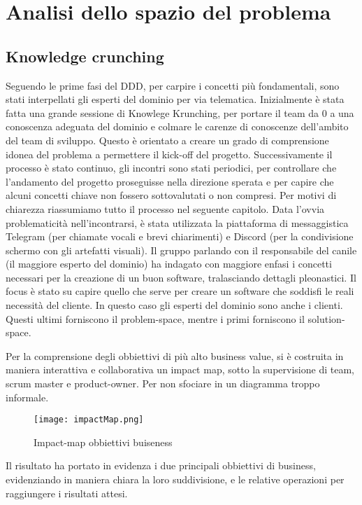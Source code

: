 \chapter{Analisi dello spazio del problema}

	\section{Knowledge crunching}
	Seguendo le prime fasi del DDD, per carpire i concetti più fondamentali, sono stati interpellati gli esperti del dominio per via telematica. 
	Inizialmente è stata fatta una grande sessione di Knowlege Krunching, per portare il team da 0 a una conoscenza adeguata del dominio e colmare le carenze di conoscenze dell'ambito del team di sviluppo. Questo è orientato a creare un grado di comprensione idonea del problema a permettere il kick-off del progetto.  
	Successivamente il processo è stato continuo, gli incontri sono stati periodici, per controllare che l'andamento del progetto proseguisse nella direzione sperata e per capire che alcuni concetti chiave non fossero sottovalutati o non compresi. 
	Per motivi di chiarezza riassumiamo tutto il processo nel seguente capitolo.
	Data l'ovvia problematicità nell'incontrarsi, è stata utilizzata la piattaforma di messaggistica Telegram (per chiamate vocali e brevi chiarimenti) e Discord (per la condivisione schermo con gli artefatti visuali). 
	Il gruppo parlando con il responsabile del canile (il maggiore esperto del dominio) ha indagato con maggiore enfasi i concetti necessari per la creazione di un buon software, tralasciando dettagli pleonastici. Il focus è stato su capire quello che serve per creare un software che soddisfi le reali necessità del cliente. 
	In questo caso gli esperti del dominio sono anche i clienti. Questi ultimi forniscono il problem-space, mentre i primi forniscono il solution-space.
	
	Per la comprensione degli obbiettivi di più alto business value, si è costruita in maniera interattiva e collaborativa un impact map, sotto la supervisione di team, scrum master e product-owner. Per non sfociare in un diagramma troppo informale.
	\begin{figure}[ht]
        \caption{Impact-map obbiettivi buiseness}
        \centering
        \texttt{[image: impactMap.png]}
    \end{figure}

    Il risultato ha portato in evidenza i due principali obbiettivi di business, evidenziando in maniera chiara la loro suddivisione, e le relative operazioni per raggiungere i risultati attesi.
    
